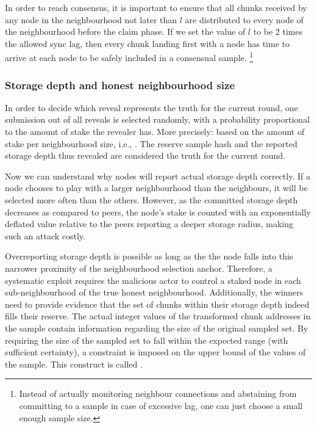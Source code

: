 In order to reach consensus, it is important to ensure that all chunks received by any node in the neighbourhood not later than $l$ are distributed to every node of the neighbourhood before the claim phase.
%
If we set the value of $l$ to be 2 times the allowed sync lag, then every chunk landing first with a node has time to arrive at each node to be safely included in a consensual sample.%
%
\footnote{Instead of actually monitoring neighbour connections and abstaining from committing to a sample in case of excessive lag, one can just choose a small enough sample size.}%
%

\subsubsection{Storage depth and honest neighbourhood size}

In order to decide which reveal represents the truth for the current round, one submission out of all reveals is selected randomly, with a probability proportional to the amount of stake the revealer has. More precisely: based on the amount of stake per neighbourhood size, i.e., . The reserve sample hash and the reported storage depth thus revealed are considered the truth for the current round. 

Now we can understand why nodes will report actual storage depth correctly. If a node chooses to play with a larger neighbourhood than the neighbours, it will be selected more often than the others. However, as the committed storage depth decreases as compared to peers, the node's stake is counted with an exponentially deflated value relative to the peers reporting a deeper storage radius, making such an attack costly.  

Overreporting storage depth is possible as long as the the node falls into this narrower proximity of the neighbourhood selection anchor. Therefore, a systematic exploit requires the malicious actor to control a staked node in each sub-neighbourhood of the true honest neighbourhood. 
Additionally, the winners need to provide evidence that the set of chunks within their storage depth indeed fills their reserve. 
The actual integer values of the transformed chunk addresses in the sample contain information regarding the size of the original sampled set.  
By requiring the size of the sampled set to fall within the expected range (with sufficient certainty), a constraint is imposed on the upper bound of the values of the sample. This construct is called %
.
%

